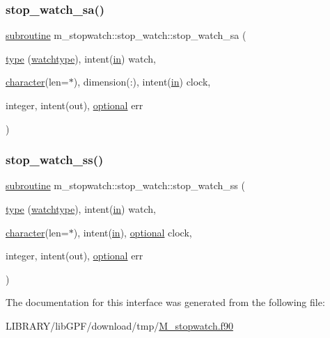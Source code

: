\subsubsection{\texorpdfstring{stop\+\_\+watch\+\_\+sa()}{stop\_watch\_sa()}}
{\footnotesize\ttfamily \hyperlink{M__stopwatch_83_8txt_acfbcff50169d691ff02d4a123ed70482}{subroutine} m\+\_\+stopwatch\+::stop\+\_\+watch\+::stop\+\_\+watch\+\_\+sa (\begin{DoxyParamCaption}\item[{\hyperlink{stop__watch_83_8txt_a70f0ead91c32e25323c03265aa302c1c}{type} (\hyperlink{structm__stopwatch_1_1watchtype}{watchtype}), intent(\hyperlink{M__journal_83_8txt_afce72651d1eed785a2132bee863b2f38}{in})}]{watch,  }\item[{\hyperlink{option__stopwatch_83_8txt_abd4b21fbbd175834027b5224bfe97e66}{character}(len=$\ast$), dimension(\+:), intent(\hyperlink{M__journal_83_8txt_afce72651d1eed785a2132bee863b2f38}{in})}]{clock,  }\item[{integer, intent(out), \hyperlink{option__stopwatch_83_8txt_aa4ece75e7acf58a4843f70fe18c3ade5}{optional}}]{err }\end{DoxyParamCaption})\hspace{0.3cm}{\ttfamily [private]}}

\mbox{\label{interfacem__stopwatch_1_1stop__watch_aea9b4bc1eb43b9b9b3ccb5c0250aec43}} 
\subsubsection{\texorpdfstring{stop\+\_\+watch\+\_\+ss()}{stop\_watch\_ss()}}
{\footnotesize\ttfamily \hyperlink{M__stopwatch_83_8txt_acfbcff50169d691ff02d4a123ed70482}{subroutine} m\+\_\+stopwatch\+::stop\+\_\+watch\+::stop\+\_\+watch\+\_\+ss (\begin{DoxyParamCaption}\item[{\hyperlink{stop__watch_83_8txt_a70f0ead91c32e25323c03265aa302c1c}{type} (\hyperlink{structm__stopwatch_1_1watchtype}{watchtype}), intent(\hyperlink{M__journal_83_8txt_afce72651d1eed785a2132bee863b2f38}{in})}]{watch,  }\item[{\hyperlink{option__stopwatch_83_8txt_abd4b21fbbd175834027b5224bfe97e66}{character}(len=$\ast$), intent(\hyperlink{M__journal_83_8txt_afce72651d1eed785a2132bee863b2f38}{in}), \hyperlink{option__stopwatch_83_8txt_aa4ece75e7acf58a4843f70fe18c3ade5}{optional}}]{clock,  }\item[{integer, intent(out), \hyperlink{option__stopwatch_83_8txt_aa4ece75e7acf58a4843f70fe18c3ade5}{optional}}]{err }\end{DoxyParamCaption})\hspace{0.3cm}{\ttfamily [private]}}



The documentation for this interface was generated from the following file\+:\begin{DoxyCompactItemize}
\item 
L\+I\+B\+R\+A\+R\+Y/lib\+G\+P\+F/download/tmp/\hyperlink{M__stopwatch_8f90}{M\+\_\+stopwatch.\+f90}\end{DoxyCompactItemize}
